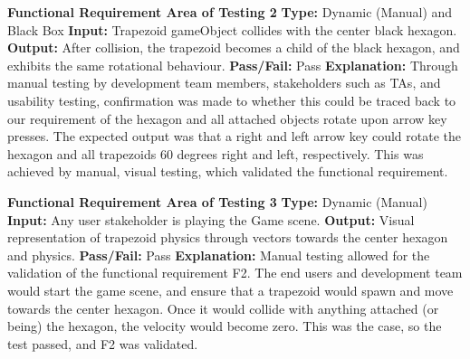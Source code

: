 \documentclass[12pt, titlepage]{article}
\begin{document}
    \noindent \textbf{Functional Requirement Area of Testing 2}
    \newline
\textbf{Type:} Dynamic (Manual) and Black Box
\newline
\textbf{Input:} Trapezoid gameObject collides with the center black hexagon. 
\newline
\textbf{Output:} After collision, the trapezoid becomes a child of the
black hexagon, and exhibits the same rotational behaviour.
\newline
\textbf{Pass/Fail:} Pass
\newline
\textbf{Explanation:} Through manual testing by development team members, stakeholders such as TAs, and usability testing, confirmation was made to whether this could be traced back to our requirement of the hexagon and all attached objects rotate upon arrow key presses. The expected output was that a right and left arrow key could rotate the hexagon and all trapezoids 60 degrees right and left, respectively. This was achieved by manual, visual testing, which validated the functional requirement. \newline \newline

\noindent \textbf{Functional Requirement Area of Testing 3}
\newline
\textbf{Type:} Dynamic (Manual) 
\newline
\textbf{Input:}  Any user stakeholder is playing the Game scene.
\newline
\textbf{Output:} Visual representation of trapezoid physics through vectors towards the center hexagon and physics.
\newline
\textbf{Pass/Fail:} Pass
\newline
\textbf{Explanation:} Manual testing allowed for the validation of the functional requirement F2. The end users and development team would start the game scene, and ensure that a trapezoid would spawn and move towards the center hexagon. Once it would collide with anything attached (or being) the hexagon, the velocity would become zero. This was the case, so the test passed, and F2 was validated. \newline \newline 
\end{document}

